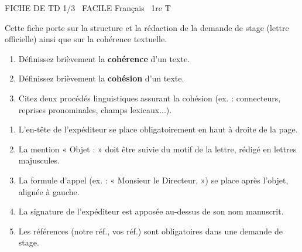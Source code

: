 \documentclass[11pt]{article}
\begin{document}
\begin{tcolorbox}[enhanced,colback=popink,colframe=popink,arc=10pt,boxrule=0pt,left=12pt,right=12pt,top=9pt,bottom=9pt]
{\color{white}\popxbold\small FICHE DE TD 1/3 \textbullet\ FACILE \hfill Français \textbullet\ 1re T\par}
\end{tcolorbox}
\vspace{4pt}
Cette fiche porte sur la structure et la rédaction de la demande de stage (lettre officielle) ainsi que sur la cohérence textuelle.

\begin{exercice}
\begin{enumerate}
    \item Définissez brièvement la \textbf{cohérence} d'un texte.
    \item Définissez brièvement la \textbf{cohésion} d'un texte.
    \item Citez deux procédés linguistiques assurant la cohésion (ex. : connecteurs, reprises pronominales, champs lexicaux...).
\end{enumerate}
\end{exercice}

\begin{exercice}
\begin{enumerate}
    \item L'en-tête de l'expéditeur se place obligatoirement en haut à droite de la page.
    \item La mention « Objet : » doit être suivie du motif de la lettre, rédigé en lettres majuscules.
    \item La formule d'appel (ex. : « Monsieur le Directeur, ») se place après l'objet, alignée à gauche.
    \item La signature de l'expéditeur est apposée au-dessus de son nom manuscrit.
    \item Les références (notre réf., vos réf.) sont obligatoires dans une demande de stage.
\end{enumerate}
\end{exercice}
\end{document}
